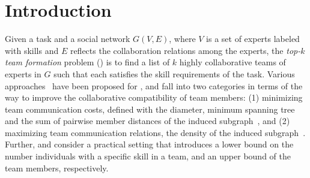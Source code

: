 \section{Introduction}
\label{sec-intro}

Given a task and a social network $G(V, E)$, where $V$ is a set of experts labeled with skills and $E$ reflects the collaboration relations among the experts,
the {\em top-$k$ team formation} problem (\teamF) is to find a list of $k$ highly collaborative teams of experts in $G$ such that each satisfies the skill requirements of the task.
Various approaches~\cite{Lappas09,Kargar11,ArisLuca12,GajewarS12,realTeamForm13,SamikKVM12} have been proposed for \teamF,
and fall into two categories in terms of the way to improve the collaborative compatibility of team members:
 (1) minimizing team communication costs,
defined with \eg the diameter, minimum spanning tree and the sum of pairwise member distances of the induced subgraph~\cite{Lappas09,Kargar11,ArisLuca12,SamikKVM12}, and
(2) maximizing team communication relations,
\eg the density of the induced subgraph~\cite{GajewarS12,realTeamForm13}.
Further, \cite{GajewarS12} and \cite{realTeamForm13} consider a practical setting that introduces a lower bound on the number individuals with a specific skill in a team, and an upper bound of the team members, respectively.


